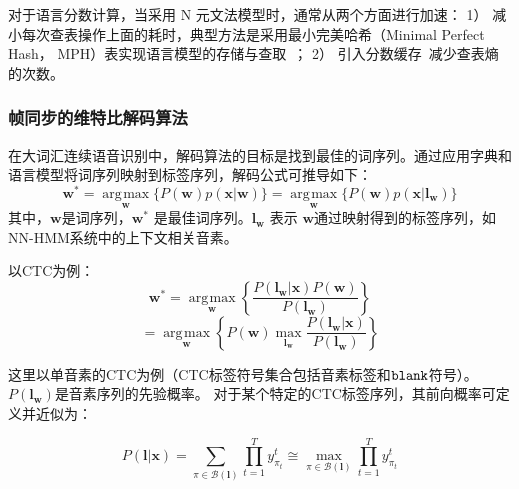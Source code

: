 对于语言分数计算，当采用 N 元文法模型时，通常从两个方面进行加速： 1）
减小每次查表操作上面的耗时，典型方法是采用最小完美哈希（Minimal Perfect Hash，
MPH）表实现语言模型的存储与查取~\cite{li2007fast,cardenal2002fast}； 2） 引入分数缓存~\cite{huijbregts2008fast}减少查表熵的次数。

\subsubsection{帧同步的维特比解码算法}
\label{chap:lsd-review-fsd}

在大词汇连续语音识别中，解码算法的目标是找到最佳的词序列。通过应用字典和语言模型将词序列映射到标签序列，解码公式可推导如下：
\begin{equation}\label{eq:asr-dec}
        \mathbf{w}^*=\mathop{\arg\!\max}\limits_\mathbf{w} \{
        P(\mathbf{w})p(\mathbf{x}|\mathbf{w})
        \}=\mathop{\arg\!\max}\limits_\mathbf{w} \{
        P(\mathbf{w})p(\mathbf{x}|\mathbf{l}_\mathbf{w})
        \} %
     \end{equation}
其中，$\mathbf{w}$是词序列，${\mathbf{w}}^*$ 是最佳词序列。$\mathbf{l}_{\mathbf{w}}$ 表示 $\mathbf{w}$通过映射得到的标签序列，如NN-HMM系统中的上下文相关音素。

以CTC为例：
\begin{equation}\label{eq:ctc-with-prior}
        \mathbf{w}^*=\mathop{\arg\!\max}\limits_\mathbf{w} \left\{
        \frac{P(\mathbf{l}_\mathbf{w}|\mathbf{x})P(\mathbf{w})}{P(\mathbf{l}_\mathbf{w})}
        \right\}
     \end{equation}
     \begin{equation} \label{eq:ctc-dec}
    = \mathop{\arg\!\max}\limits_\mathbf{w} \left\{
        P(\mathbf{w})
        \mathop{\max}\limits_{\mathbf{l}_\mathbf{w}} \frac{P( \mathbf{l}_\mathbf{w}|\mathbf{x} )}{P(\mathbf{l}_\mathbf{w})}\right\}
     \end{equation}

这里以单音素的CTC为例（CTC标签符号集合包括音素标签和$\tt blank$符号）。   $P(\mathbf{l}_\mathbf{w})$是音素序列的先验概率。
对于某个特定的CTC标签序列，其前向概率可定义\cite{graves2006connectionist}并近似为：

        \begin{equation} \label{eq:fwd-ctc}
        P(\mathbf{l}|\mathbf{x}) =
        \sum_{\pi\in\mathcal{B}(\mathbf{l})} %
           {\prod_{t=1}^{T}{y^{t}_{\pi_{t}}}}
        \cong \mathop{\max}\limits_{\pi\in\mathcal{B}(\mathbf{l})}
           {\prod_{t=1}^{T}{y^{t}_{\pi_{t}}}}
        \end{equation}



